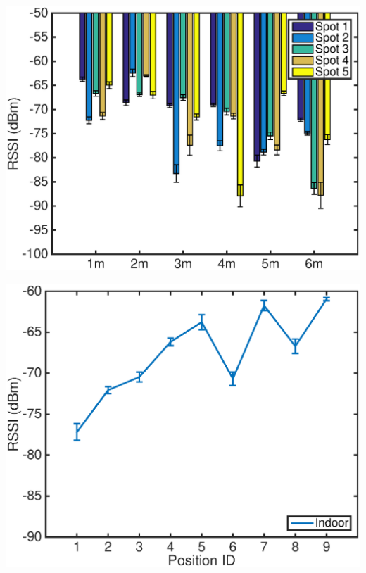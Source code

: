 \documentclass[11pt]{beamer}
\author{Hong Xiong}
\begin{document}
\begin{frame}
\includegraphics[width=\textwidth]{6m_5spot.eps} 
\end{frame}


\begin{frame}
\includegraphics[width=\textwidth]{deep_fading_2530_plot_indoor.eps} 
\end{frame}
\end{document}

